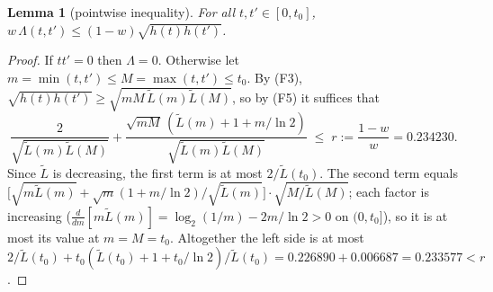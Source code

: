 \documentclass[11pt,a4paper]{article}
\newtheorem{lemma}[theorem]{Lemma}
\theoremstyle{definition}
\theoremstyle{remark}
\newcommand{\ent}{h}
\begin{document}
\begin{lemma}[pointwise inequality]\label{lem:pointwise}
For all $t,t'\in[0,t_0]$, $w\,\Lambda(t,t')\le(1-w)\sqrt{\ent(t)\ent(t')}$.
\end{lemma}
\begin{proof}
If $tt'=0$ then $\Lambda=0$. Otherwise let $m=\min(t,t')\le M=\max(t,t')\le t_0$. By (F3), $\sqrt{\ent(t)\ent(t')}\ge\sqrt{mM\,\tilde L(m)\tilde L(M)}$, so by (F5) it suffices that
\[\frac{2}{\sqrt{\tilde L(m)\tilde L(M)}}+\frac{\sqrt{mM}\,(\tilde L(m)+1+m/\ln2)}{\sqrt{\tilde L(m)\tilde L(M)}}\;\le\;r:=\frac{1-w}{w}=0.234230.\]
Since $\tilde L$ is decreasing, the first term is at most $2/\tilde L(t_0)$. The second term equals $\big[\sqrt{m\tilde L(m)}+\sqrt m(1+m/\ln2)/\sqrt{\tilde L(m)}\big]\cdot\sqrt{M/\tilde L(M)}$; each factor is increasing ($\frac{d}{dm}[m\tilde L(m)]=\log_2(1/m)-2m/\ln2>0$ on $(0,t_0]$), so it is at most its value at $m=M=t_0$. Altogether the left side is at most $2/\tilde L(t_0)+t_0(\tilde L(t_0)+1+t_0/\ln2)/\tilde L(t_0)=0.226890+0.006687=0.233577<r$.
\end{proof}
\end{document}
